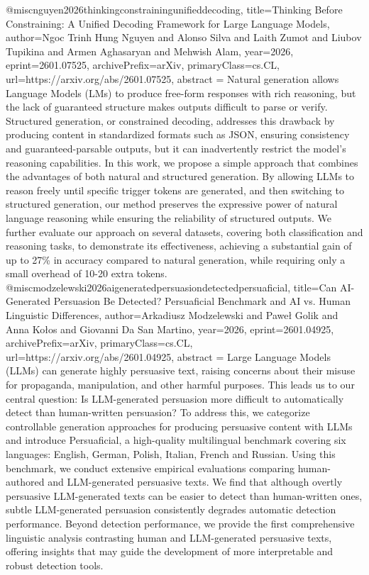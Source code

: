 {}@misc{nguyen2026thinkingconstrainingunifieddecoding,
      title={Thinking Before Constraining: A Unified Decoding Framework for Large Language Models}, 
      author={Ngoc Trinh Hung Nguyen and Alonso Silva and Laith Zumot and Liubov Tupikina and Armen Aghasaryan and Mehwish Alam},
      year={2026},
      eprint={2601.07525},
      archivePrefix={arXiv},
      primaryClass={cs.CL},
      url={https://arxiv.org/abs/2601.07525},
      abstract = {Natural generation allows Language Models (LMs) to produce free-form responses with rich reasoning, but the lack of guaranteed structure makes outputs difficult to parse or verify. Structured generation, or constrained decoding, addresses this drawback by producing content in standardized formats such as JSON, ensuring consistency and guaranteed-parsable outputs, but it can inadvertently restrict the model's reasoning capabilities. In this work, we propose a simple approach that combines the advantages of both natural and structured generation. By allowing LLMs to reason freely until specific trigger tokens are generated, and then switching to structured generation, our method preserves the expressive power of natural language reasoning while ensuring the reliability of structured outputs. We further evaluate our approach on several datasets, covering both classification and reasoning tasks, to demonstrate its effectiveness, achieving a substantial gain of up to 27\% in accuracy compared to natural generation, while requiring only a small overhead of 10-20 extra tokens.}
}@misc{modzelewski2026aigeneratedpersuasiondetectedpersuaficial,
      title={Can AI-Generated Persuasion Be Detected? Persuaficial Benchmark and AI vs. Human Linguistic Differences}, 
      author={Arkadiusz Modzelewski and Paweł Golik and Anna Kołos and Giovanni Da San Martino},
      year={2026},
      eprint={2601.04925},
      archivePrefix={arXiv},
      primaryClass={cs.CL},
      url={https://arxiv.org/abs/2601.04925},
      abstract = {Large Language Models (LLMs) can generate highly persuasive text, raising concerns about their misuse for propaganda, manipulation, and other harmful purposes. This leads us to our central question: Is LLM-generated persuasion more difficult to automatically detect than human-written persuasion? To address this, we categorize controllable generation approaches for producing persuasive content with LLMs and introduce Persuaficial, a high-quality multilingual benchmark covering six languages: English, German, Polish, Italian, French and Russian. Using this benchmark, we conduct extensive empirical evaluations comparing human-authored and LLM-generated persuasive texts. We find that although overtly persuasive LLM-generated texts can be easier to detect than human-written ones, subtle LLM-generated persuasion consistently degrades automatic detection performance. Beyond detection performance, we provide the first comprehensive linguistic analysis contrasting human and LLM-generated persuasive texts, offering insights that may guide the development of more interpretable and robust detection tools.}
}
